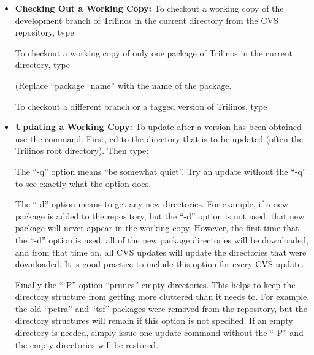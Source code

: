 \documentclass[12pt,relax]{TrilinosUserGuide}
\begin{document}
\begin{itemize}
\item {\bf Checking Out a Working Copy:}
To checkout a working copy of the development branch of Trilinos in the 
current directory from the CVS repository, type


To checkout a working copy of only one package of Trilinos in the 
current directory, type


(Replace ``package\_name'' with the name of the package.

To checkout a different branch or a tagged version of Trilinos, type


\item {\bf Updating a Working Copy:}
To update after a version has been obtained use the  
command.  First, cd to the directory that is to be updated (often the 
Trilinos root directory).  Then type:


The ``-q'' option means ``be somewhat quiet''.  Try an update without the 
``-q'' to see exactly what the option does.  

The ``-d'' option means to get any new directories.  For example, if a new 
package is added to the repository, but the ``-d'' option is not used, that 
new package will never appear in the working copy.  However, the first time 
that the ``-d'' option is used, all of the new package directories will be 
downloaded, and from that time on, all CVS updates will update the 
directories that were downloaded.  It is good practice to include this 
option for every CVS update.

Finally the ``-P'' option ``prunes'' empty directories.  This helps to keep 
the directory structure from getting more cluttered than it needs to.  For 
example, the old ``petra'' and ``tsf'' packages were removed from the 
repository, but the directory structures will remain if this option is not 
specified.  If an empty directory is needed, simply issue one update 
command without the ``-P'' and the empty directories will be restored.


\end{itemize}

\end{document}
